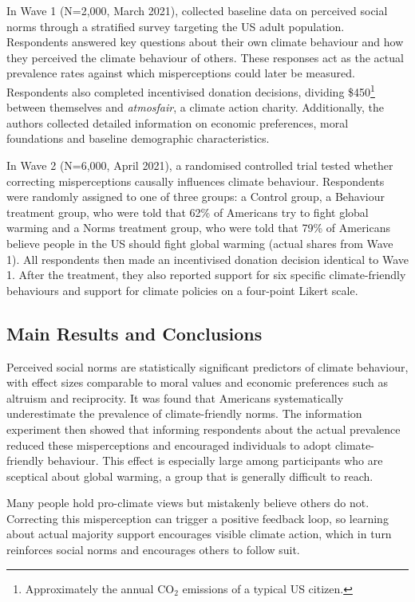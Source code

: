 \documentclass[11pt,a4paper]{scrartcl}
\numberwithin{equation}{section}
\theoremstyle{definition}
\theoremstyle{remark}
\newenvironment{keymessage}[1][Key Message]{%
  \begin{tcolorbox}[title=#1]%
}{%
  \end{tcolorbox}%
}
\begin{document}
    In Wave 1 (N=2,000, March 2021), \textcite{andre2024} collected baseline data on perceived social norms through a stratified survey targeting the US adult population. Respondents answered key questions about their own climate behaviour and how they perceived the climate behaviour of others. These responses act as the actual prevalence rates against which misperceptions could later be measured. Respondents also completed incentivised donation decisions, dividing \$450\footnote{Approximately the annual CO$_2$ emissions of a typical US citizen.} between themselves and \textit{atmosfair}, a climate action charity. Additionally, the authors collected detailed information on economic preferences, moral foundations and baseline demographic characteristics.
    
    In Wave 2 (N=6,000, April 2021), a randomised controlled trial tested whether correcting misperceptions causally influences climate behaviour. Respondents were randomly assigned to one of three groups: a Control group, a Behaviour treatment group, who were told that 62\% of Americans try to fight global warming and a Norms treatment group, who were told that 79\% of Americans believe people in the US should fight global warming (actual shares from Wave 1). All respondents then made an incentivised donation decision identical to Wave 1. After the treatment, they also reported support for six specific climate-friendly behaviours and support for climate policies on a four-point Likert scale.

\subsection{Main Results and Conclusions}
\label{subsec:Main Results and Conclusions}

    Perceived social norms are statistically significant predictors of climate behaviour, with effect sizes comparable to moral values and economic preferences such as altruism and reciprocity. It was found that Americans systematically underestimate the prevalence of climate-friendly norms. The information experiment then showed that informing respondents about the actual prevalence reduced these misperceptions and encouraged individuals to adopt \mbox{climate-friendly} behaviour. This effect is especially large among participants who are sceptical about global warming, a group that is generally difficult to reach.
    
    \begin{keymessage}[To Sum Up]
        Many people hold pro-climate views but mistakenly believe others do not. Correcting this misperception can trigger a positive feedback loop, so learning about actual majority support encourages visible climate action, which in turn reinforces social norms and encourages others to follow suit.
    \end{keymessage}
    
\end{document}
